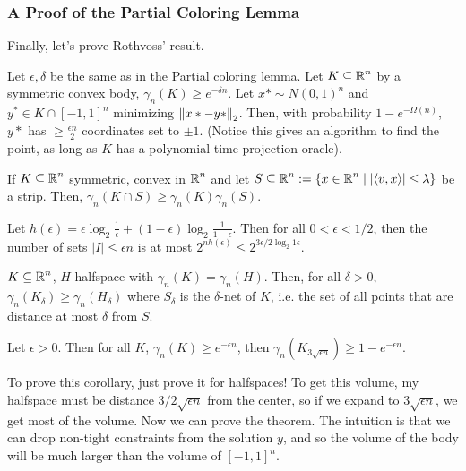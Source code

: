 \subsubsection{A Proof of the Partial Coloring Lemma}
Finally, let's prove Rothvoss' result.
\begin{theorem}
    Let $\epsilon, \delta$ be the same as in the Partial coloring lemma. Let $K\subseteq \operatorname{\mathbb{R}}^n$
    by a symmetric convex body, $\gamma_n(K) \ge e^{-\delta n}$.
    Let $x* \sim N(0, 1)^n$ and $y^* \in K\cap [-1, 1]^n$ minimizing $\norm{x* - y*}_2$.
    Then, with probability $ 1- e^{-\Omega(n)}$, $y*$ has $\ge \frac{\epsilon n}{2}$ coordinates set to $\pm 1$.
    (Notice this gives an algorithm to find the point, as long as $K$ has a polynomial time projection
    oracle).
\end{theorem}

\begin{fact}
    If $K \subseteq \operatorname{\mathbb{R}}^n$ symmetric, convex in $\operatorname{\mathbb{R}}^n$ and let $S\subseteq \operatorname{\mathbb{R}}^n := \{x \in \operatorname{\mathbb{R}}^n \mid |\langle v, x \rangle| \le \lambda\}$
    be a strip. Then, $\gamma_n(K\cap S) \ge \gamma_n(K) \gamma_n(S)$.
\end{fact}

\begin{fact}
    Let $h(\epsilon) = \epsilon \log_2 \frac{1}{\epsilon} + (1 - \epsilon) \log_2 \frac{1}{1 - \epsilon}$.
    Then for all $0 < \epsilon <1/2$,
    then the number of sets $|I| \le \epsilon n$ is at most $2^{nh(\epsilon)} \le 2^{3\epsilon/2 \log_2 1\epsilon}$.
\end{fact}

\begin{fact}
    $K \subseteq \operatorname{\mathbb{R}}^n$, $H$ halfspace with $\gamma_n(K) = \gamma_n(H)$.
    Then, for all $\delta > 0$, $\gamma_n(K_{\delta}) \ge \gamma_n(H_{\delta})$
    where $S_{\delta}$ is the $\delta$-net of $K$, i.e. the set of all points that are distance at most $\delta$ from $S$.
\end{fact}

\begin{corollary}
    Let $\epsilon > 0$. Then for all $K$, $\gamma_n(K) \ge e^{-\epsilon n}$,
    then $\gamma_n(K_{3\sqrt{\epsilon n}}) \ge 1 - e^{-\epsilon n}$.
\end{corollary}

To prove this corollary, just prove it for halfspaces! To get this volume, my halfspace must be distance $3/2 \sqrt{\epsilon n}$
from the center, so if we expand to $3\sqrt{\epsilon n}$, we get most of the volume. Now we can prove the theorem.
The intuition is that we can drop non-tight constraints from the solution $y$, and so the volume of the body will be much larger than
the volume of $[-1, 1]^n$.

